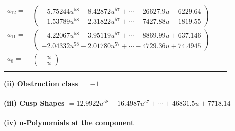 \documentclass[1p]{elsarticle_modified}
\theoremstyle{definition}
\begin{document}
\begin{tabular}{m{7pt} m{180pt} m{7pt} m{180pt} }
\flushright $a_{12}=$&$\begin{pmatrix}-5.75244 u^{58}-8.42872 u^{57}+\cdots-26627.9 u-6229.64\\-1.53789 u^{58}-2.31822 u^{57}+\cdots-7427.88 u-1819.55\end{pmatrix}$ \\
\flushright $a_{11}=$&$\begin{pmatrix}-4.22067 u^{58}-3.95119 u^{57}+\cdots-8869.99 u+637.146\\-2.04332 u^{58}-2.01780 u^{57}+\cdots-4729.36 u+74.4945\end{pmatrix}$ \\
\flushright $a_{8}=$&$\begin{pmatrix}- u\\- u\end{pmatrix}$\\&\end{tabular}
\flushleft \textbf{(ii) Obstruction class $= -1$}\\~\\
\flushleft \textbf{(iii) Cusp Shapes $= 12.9922 u^{58}+16.4987 u^{57}+\cdots+46831.5 u+7718.14$}\\~\\
\newpage\renewcommand{\arraystretch}{1}
\flushleft \textbf{(iv) u-Polynomials at the component}\newline \\
\end{document}
